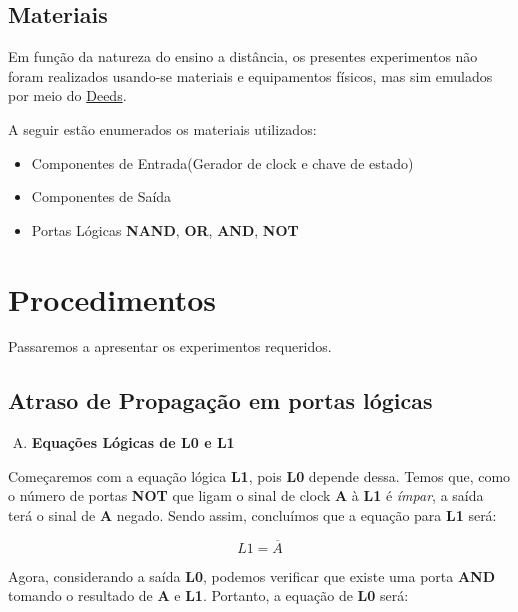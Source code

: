 \documentclass[12pt]{article}
\begin{document}
\subsection{Materiais}
\label{sec:Materiais}
Em função da natureza do ensino a distância, os presentes experimentos não foram
realizados usando-se materiais e equipamentos físicos, mas sim emulados por meio
do \href{https://www.digitalelectronicsdeeds.com/deeds.html}{Deeds}.

A seguir estão enumerados os materiais utilizados:
\begin{itemize}
    \item Componentes de Entrada(Gerador de clock e chave de estado)
    \item Componentes de Saída
    \item Portas Lógicas \textbf{NAND}, \textbf{OR}, \textbf{AND}, \textbf{NOT}
\end{itemize}

\section{Procedimentos}
\label{sec:Procedimentos}
\setcounter{subsection}{-1}

Passaremos a apresentar os experimentos requeridos.

\subsection{Atraso de Propagação em portas lógicas}\label{sec:atraso_de_propagação}

\begin{enumerate}[A)]
\item \textbf{Equações Lógicas de L0 e L1}
\end{enumerate}

Começaremos com a equação lógica \textbf{L1}, pois \textbf{L0} depende dessa. Temos que, como
o número de portas \textbf{NOT} que ligam o sinal de clock \textbf{A} à
\textbf{L1} é \emph{ímpar}, a saída terá o sinal de \textbf{A} negado. Sendo
assim, concluímos que a equação para \textbf{L1} será:

\begin{equation}
L1 = \overline{A}
\end{equation}

Agora, considerando a saída \textbf{L0}, podemos verificar que existe uma porta
\textbf{AND} tomando o resultado de \textbf{A} e \textbf{L1}. Portanto, a equação de \textbf{L0} será:
\end{document}
